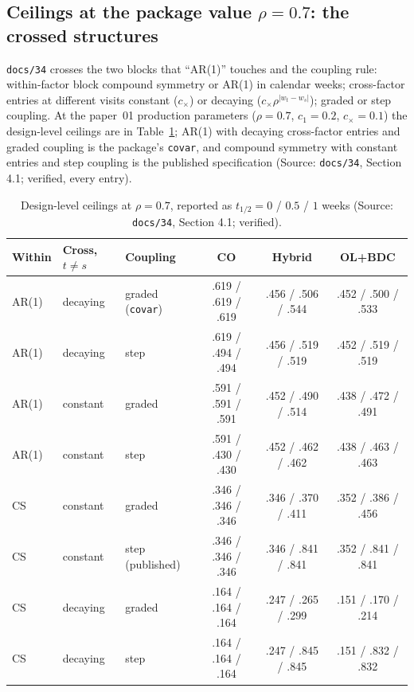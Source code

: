 \documentclass[11pt]{article}
\newcommand{\code}[1]{\texttt{#1}}
\begin{document}
\subsection{Ceilings at the package value $\rho = 0.7$: the crossed
structures}
\label{sec:inve-ce-rho7}

\code{docs/34} crosses the two blocks that ``AR(1)'' touches and the
coupling rule: within-factor block compound symmetry or AR(1) in
calendar weeks; cross-factor entries at different visits constant
($c_\times$) or decaying ($c_\times\rho^{|w_t-w_s|}$); graded or step
coupling. At the paper~01 production parameters ($\rho = 0.7$,
$c_1 = 0.2$, $c_\times = 0.1$) the design-level ceilings are in
Table~\ref{tab:inve-crossed}; AR(1) with decaying cross-factor entries
and graded coupling is the package's \code{covar}, and compound symmetry
with constant entries and step coupling is the published specification
(Source: \code{docs/34}, Section 4.1; verified, every entry).

\begin{table}[h]
\centering\small
\caption{Design-level ceilings at $\rho = 0.7$, reported as
$t_{1/2} = 0$ / $0.5$ / $1$ weeks (Source: \code{docs/34}, Section 4.1;
verified).}
\label{tab:inve-crossed}
\begin{tabular}{@{}lllccc@{}}
\toprule
Within & Cross, $t\ne s$ & Coupling & CO & Hybrid & OL+BDC \\
\midrule
AR(1) & decaying & graded (\code{covar}) & .619 / .619 / .619 & .456 / .506 / .544 & .452 / .500 / .533 \\
AR(1) & decaying & step & .619 / .494 / .494 & .456 / .519 / .519 & .452 / .519 / .519 \\
AR(1) & constant & graded & .591 / .591 / .591 & .452 / .490 / .514 & .438 / .472 / .491 \\
AR(1) & constant & step & .591 / .430 / .430 & .452 / .462 / .462 & .438 / .463 / .463 \\
CS & constant & graded & .346 / .346 / .346 & .346 / .370 / .411 & .352 / .386 / .456 \\
CS & constant & step (published) & .346 / .346 / .346 & .346 / .841 / .841 & .352 / .841 / .841 \\
CS & decaying & graded & .164 / .164 / .164 & .247 / .265 / .299 & .151 / .170 / .214 \\
CS & decaying & step & .164 / .164 / .164 & .247 / .845 / .845 & .151 / .832 / .832 \\
\bottomrule
\end{tabular}
\end{table}
\end{document}
